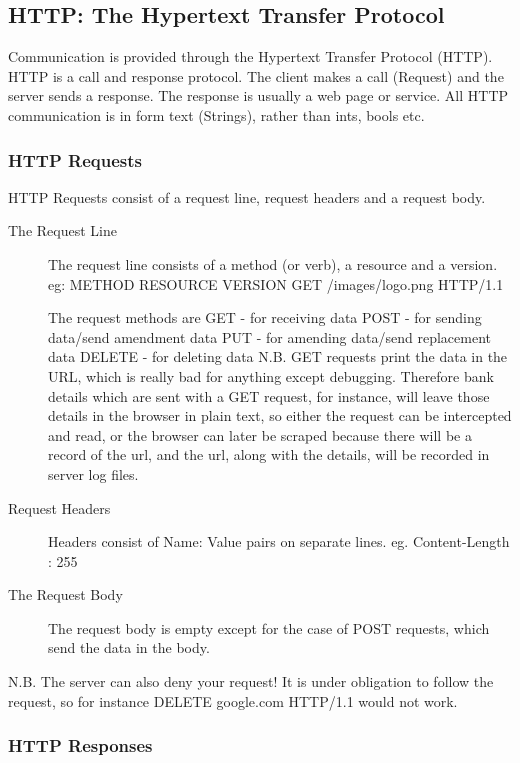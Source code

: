\documentclass[11pt]{article}
\begin{document}
\subsection{HTTP: The Hypertext Transfer Protocol}
\label{http}

Communication is provided through the Hypertext Transfer Protocol (HTTP). HTTP is a call and response protocol. The client makes a call (Request) and the server sends a response. The response is usually a web page or service. All HTTP communication is in form text (Strings), rather than ints, bools etc.

\subsubsection{HTTP Requests}

HTTP Requests consist of a request line, request headers and a request body.
\begin{description}
\item[The Request Line]
The request line consists of a method (or verb), a resource and a version.
eg:
METHOD    RESOURCE          VERSION
     GET    /images/logo.png    HTTP/1.1

The request methods are 
GET - for receiving data
POST - for sending data/send amendment data
PUT - for amending data/send replacement data
DELETE - for deleting data
N.B. GET requests print the data in the URL, which is really bad for anything except debugging. Therefore bank details which are sent with a GET request, for instance, will leave those details in the browser in plain text, so either the request can be intercepted and read, or the browser can later be scraped because there will be a record of the url, and the url, along with the details, will be recorded in server log files.
\item[Request Headers]
Headers consist of Name: Value pairs on separate lines.
eg.
Content-Length    :    255
\item[The Request Body]
The request body is empty except for the case of POST requests, which send the data in the body.
\end{description}

N.B. The server can also deny your request! It is under obligation to follow the request, so for instance DELETE    google.com    HTTP/1.1 would not work.

\subsubsection{HTTP Responses}
\end{document}
